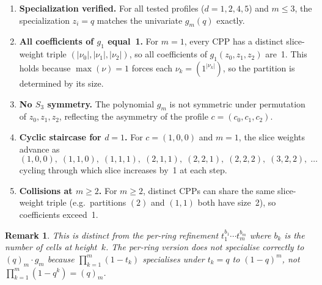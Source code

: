 \documentclass[11pt]{article}
\newtheorem{remark}[theorem]{Remark}
\begin{document}
\begin{enumerate}
\item \textbf{Specialization verified.}  For all tested profiles
  ($d = 1, 2, 4, 5$) and $m \leq 3$, the specialization
  $z_i = q$ matches the univariate $g_m(q)$ exactly.

\item \textbf{All coefficients of $g_1$ equal~1.}
  For $m = 1$, every CPP has a distinct slice-weight triple
  $(|\nu_0|, |\nu_1|, |\nu_2|)$, so all coefficients of
  $g_1(z_0, z_1, z_2)$ are~1.  This holds because $\max(\nu) = 1$
  forces each $\nu_k = (1^{|\nu_k|})$, so the partition is
  determined by its size.

\item \textbf{No $S_3$ symmetry.}  The polynomial $g_m$ is not
  symmetric under permutation of $z_0, z_1, z_2$, reflecting
  the asymmetry of the profile $c = (c_0, c_1, c_2)$.

\item \textbf{Cyclic staircase for $d = 1$.}
  For $c = (1,0,0)$ and $m = 1$, the slice weights advance as
  \[
    (1,0,0),\; (1,1,0),\; (1,1,1),\; (2,1,1),\; (2,2,1),\;
    (2,2,2),\; (3,2,2),\; \ldots
  \]
  cycling through which slice increases by~1 at each step.

\item \textbf{Collisions at $m \geq 2$.}
  For $m \geq 2$, distinct CPPs can share the same slice-weight
  triple (e.g.\ partitions $(2)$ and $(1,1)$ both have size~2),
  so coefficients exceed~1.
\end{enumerate}

\begin{remark}
  This is distinct from the \emph{per-ring} refinement
  $t_1^{b_1} \cdots t_m^{b_m}$ where $b_k$ is the number of cells
  at height~$k$.  The per-ring version does not specialise correctly
  to $(q)_m \cdot g_m$ because $\prod_{k=1}^m (1 - t_k)$ specialises
  under $t_k = q$ to $(1-q)^m$, not $\prod_{k=1}^m (1-q^k) = (q)_m$.
\end{remark}
\end{document}

